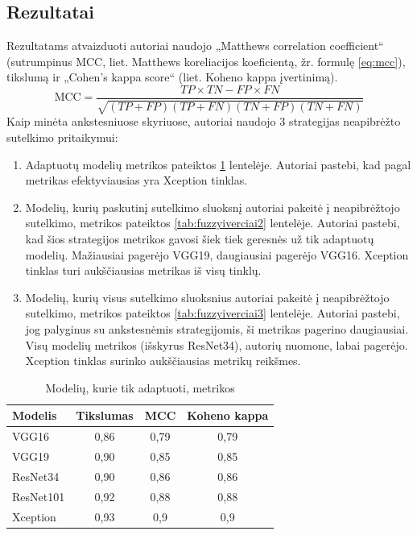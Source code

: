 \documentclass[fleqn]{VUMIFKompMagistrinis}
\begin{document}
\subsection{Rezultatai}
Rezultatams atvaizduoti autoriai naudojo „Matthews correlation coefficient“ (sutrumpinus MCC, liet. Matthews koreliacijos koeficientą, žr. formulę \ref{eq:mcc}), tikslumą ir „Cohen's kappa score“ (liet. Koheno kappa įvertinimą). \cite{HASAN2023}
\begin{equation}\label{eq:mcc}
\text{MCC} = \frac{TP \times TN - FP \times FN}{\sqrt{(TP + FP)(TP + FN)(TN + FP)(TN + FN)}}
\end{equation} Kaip minėta ankstesniuose skyriuose, autoriai naudojo 3 strategijas neapibrėžto sutelkimo pritaikymui:
\begin{enumerate}
    \item Adaptuotų modelių metrikos pateiktos \ref{tab:fuzzyiverciai1} lentelėje. Autoriai pastebi, kad pagal metrikas efektyviausias yra Xception tinklas.
    \item Modelių, kurių paskutinį sutelkimo sluoksnį autoriai pakeitė į neapibrėžtojo sutelkimo,  metrikos pateiktos \ref{tab:fuzzyiverciai2} lentelėje. Autoriai pastebi, kad šios strategijos metrikos gavosi šiek tiek geresnės už tik adaptuotų modelių. Mažiausiai pagerėjo VGG19, daugiausiai pagerėjo VGG16. Xception tinklas turi aukščiausias metrikas iš visų tinklų.
    \item Modelių, kurių visus sutelkimo sluoksnius autoriai pakeitė į neapibrėžtojo sutelkimo,  metrikos pateiktos \ref{tab:fuzzyiverciai3} lentelėje. Autoriai pastebi, jog palyginus su ankstesnėmis strategijomis, ši metrikas pagerino daugiausiai. Visų modelių metrikos (išskyrus ResNet34), autorių nuomone, labai pagerėjo. Xception tinklas surinko aukščiausias metrikų reikšmes.
\end{enumerate}\begin{table}[H]\footnotesize
  \centering
\caption{Modelių, kurie tik adaptuoti, metrikos \cite{HASAN2023}}
\begin{tabular}{|l|c|c|c|}
\hline
Modelis      & Tikslumas & MCC   & Koheno kappa \\ \hline
VGG16      & 0,86  & 0,79 &  0,79            \\
VGG19      & 0,90  & 0,85 &  0,85            \\
ResNet34   & 0,90  & 0,86 & 0,86            \\
ResNet101  & 0,92  & 0,88 & 0,88            \\
Xception   & 0,93  & 0,9 & 0,9          \\ \hline
  \end{tabular}
  \label{tab:fuzzyiverciai1}
\end{table}
\end{document}
